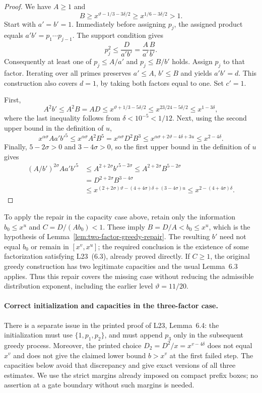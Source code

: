 \documentclass[11pt]{article}
\begin{document}
\begin{proof}
We have $A\ge1$ and
\[
 B\ge x^{\vartheta-1/3-3\delta/2}
       \ge x^{1/6-3\delta/2}>1.
\]
Start with $a'=b'=1$.  Immediately before assigning $p_j$, the
assigned product equals $a'b'=p_1\cdots p_{j-1}$.  The support
condition gives
\[
 p_j^2\le\frac{D}{a'b'}=\frac{A}{a'}\frac{B}{b'}.
\]
Consequently at least one of $p_j\le A/a'$ and $p_j\le B/b'$
holds.  Assign $p_j$ to that factor.  Iterating over all primes
preserves $a'\le A$, $b'\le B$ and yields $a'b'=d$.
This construction also covers $d=1$, by taking both factors equal
to one.  Set $c'=1$.

First,
\[
 A^2b'\le A^2B=AD
 \le x^{\vartheta+1/3-5\delta/2}
 \le x^{23/24-5\delta/2}
 \le x^{1-3\delta},
\]
where the last inequality follows from $\delta<10^{-5}<1/12$.
Next, using the second upper bound in the definition of $u$,
\[
 x^{\alpha\sigma}Aa'b'^5
 \le x^{\alpha\sigma}A^2B^5
 =x^{\alpha\sigma}D^2B^3
 \le x^{\alpha\sigma+2\vartheta-4\delta+3u}
 \le x^{2-4\delta}.
\]
Finally, $5-2\sigma>0$ and $3-4\sigma>0$, so the first upper
bound in the definition of $u$ gives
\begin{align*}
 (A/b')^{2\sigma}Aa'b'^5
 &\le A^{2+2\sigma}b'^{5-2\sigma}
 \le A^{2+2\sigma}B^{5-2\sigma}\\
 &=D^{2+2\sigma}B^{3-4\sigma}\\
 &\le x^{(2+2\sigma)\vartheta-(4+4\sigma)\delta
                         +(3-4\sigma)u}
 \le x^{2-(4+4\sigma)\delta}.
\end{align*}
\end{proof}

To apply the repair in the capacity case above, retain only the
information $b_0\le x^u$ and $C=D/(A b_0)<1$.  These imply
$B=D/A<b_0\le x^u$, which is the hypothesis of
Lemma~\ref{lem:two-factor-greedy-repair}.  The resulting $b'$ need
not equal $b_0$ or remain in $[x^v,x^u]$; the required conclusion is
the existence of some factorization satisfying L23~(6.3), already
proved directly.  If $C\ge1$, the original greedy construction
has two legitimate capacities and the usual Lemma~6.3 applies.
Thus this repair covers the missing case without reducing the
admissible distribution exponent, including the earlier level
$\vartheta=11/20$.

\paragraph{Correct initialization and capacities in the three-factor case.}
There is a separate issue in the printed proof of L23, Lemma~6.4:
the initialization must use $\{1,p_1,p_2\}$, and must append $p_3$
only in the subsequent greedy process.  Moreover, the printed
choice $D_2=D^2/x=x^{v-4\delta}$ does not equal $x^v$ and does not
give the claimed lower bound $b>x^v$ at the first failed step.
The capacities below avoid that discrepancy and give exact
versions of all three estimates.  We use the strict margins
already imposed on compact prefix boxes; no assertion at a gate
boundary without such margins is needed.
\end{document}
